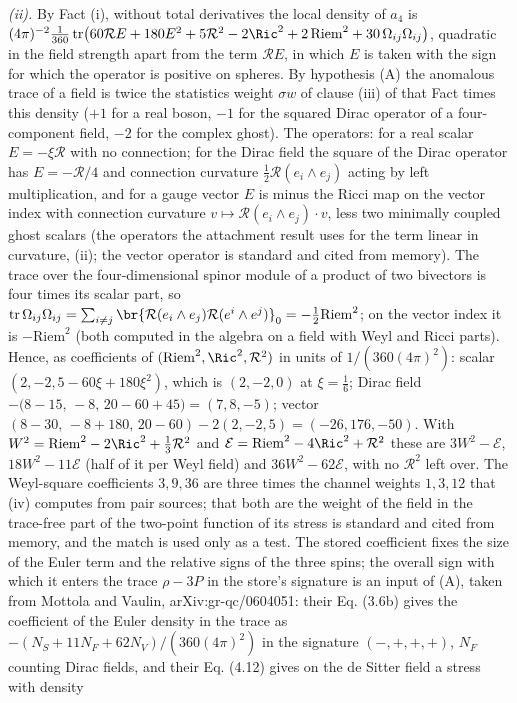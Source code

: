\emph{(ii).} By Fact (i), without total derivatives the local density of $a_{4}$ is $(4\pi)^{-2}\tfrac{1}{360}\,\mathrm{tr}\bigl(60\mathcal{R}E + 180E^{2} + 5\mathcal{R}^{2} - 2\Ric^{2} + 2\,\mathrm{Riem}^{2} + 30\,\Omega_{ij}\Omega_{ij}\bigr)$, quadratic in the field strength apart from the term $\mathcal{R}E$, in which $E$ is taken with the sign for which the operator is positive on spheres. By hypothesis (A) the anomalous trace of a field is twice the statistics weight $\sigma w$ of clause (iii) of that Fact times this density ($+1$ for a real boson, $-1$ for the squared Dirac operator of a four-component field, $-2$ for the complex ghost). The operators: for a real scalar $E = -\xi\mathcal{R}$ with no connection; for the Dirac field the square of the Dirac operator has $E = -\mathcal{R}/4$ and connection curvature $\tfrac12\mathcal{R}(e_{i} \wedge e_{j})$ acting by left multiplication, and for a gauge vector $E$ is minus the Ricci map on the vector index with connection curvature $v \mapsto \mathcal{R}(e_{i} \wedge e_{j}) \cdot v$, less two minimally coupled ghost scalars (the operators the attachment result uses for the term linear in curvature, (ii); the vector operator is standard and cited from memory). The trace over the four-dimensional spinor module of a product of two bivectors is four times its scalar part, so $\mathrm{tr}\,\Omega_{ij}\Omega_{ij} = \sum_{i \neq j}\br{\mathcal{R}(e_{i} \wedge e_{j})\mathcal{R}(e^{i} \wedge e^{j})}_{0} = -\tfrac12\mathrm{Riem}^{2}$; on the vector index it is $-\mathrm{Riem}^{2}$ (both computed in the algebra on a field with Weyl and Ricci parts). Hence, as coefficients of $(\mathrm{Riem}^{2}, \Ric^{2}, \mathcal{R}^{2})$ in units of $1/(360(4\pi)^{2})$: scalar $(2, -2, 5 - 60\xi + 180\xi^{2})$, which is $(2, -2, 0)$ at $\xi = \tfrac16$; Dirac field $-\bigl(8 - 15,\,-8,\,20 - 60 + 45\bigr) = (7, 8, -5)$; vector $(8 - 30,\,-8 + 180,\,20 - 60) - 2(2, -2, 5) = (-26, 176, -50)$. With $W^{2} = \mathrm{Riem}^{2} - 2\Ric^{2} + \tfrac13\mathcal{R}^{2}$ and $\mathcal{E} = \mathrm{Riem}^{2} - 4\Ric^{2} + \mathcal{R}^{2}$ these are $3W^{2} - \mathcal{E}$, $18W^{2} - 11\mathcal{E}$ (half of it per Weyl field) and $36W^{2} - 62\mathcal{E}$, with no $\mathcal{R}^{2}$ left over. The Weyl-square coefficients $3, 9, 36$ are three times the channel weights $1, 3, 12$ that (iv) computes from pair sources; that both are the weight of the field in the trace-free part of the two-point function of its stress is standard and cited from memory, and the match is used only as a test. The stored coefficient fixes the size of the Euler term and the relative signs of the three spins; the overall sign with which it enters the trace $\rho - 3P$ in the store's signature is an input of (A), taken from Mottola and Vaulin, arXiv:gr-qc/0604051: their Eq. (3.6b) gives the coefficient of the Euler density in the trace as $-(N_{S} + 11N_{F} + 62N_{V})/(360(4\pi)^{2})$ in the signature $(-,+,+,+)$, $N_{F}$ counting Dirac fields, and their Eq. (4.12) gives on the de Sitter field a stress with density 